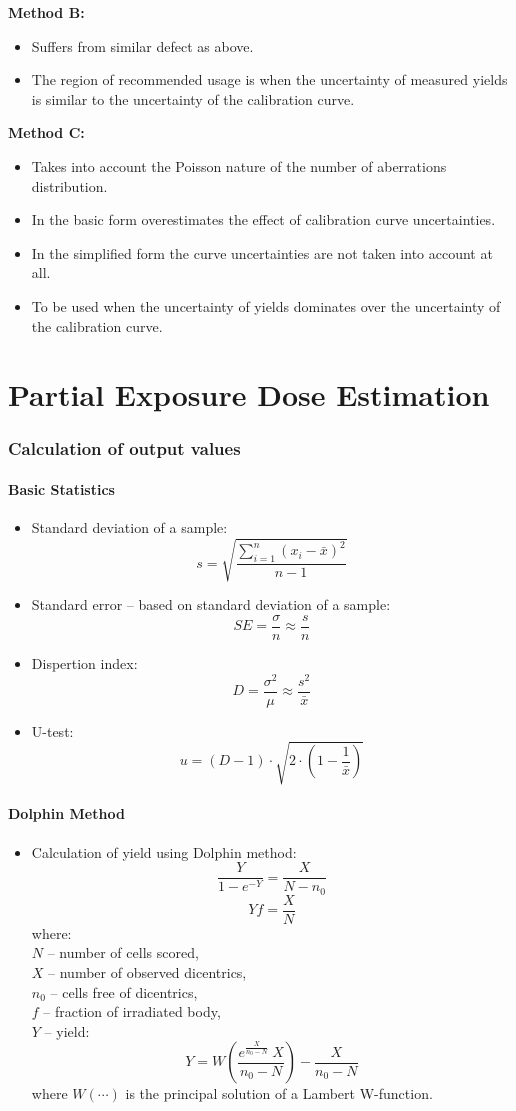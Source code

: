 \documentclass[a4paper,11pt]{article}
\begin{document}
\noindent \textbf{Method B:}
\begin{itemize}
\item Suffers from similar defect as above.
\item The region of recommended usage is when the uncertainty of measured yields is similar to the uncertainty of the calibration curve.
\end{itemize}

\noindent \textbf{Method C:}
\begin{itemize}
\item Takes into account the Poisson nature of the number of aberrations distribution.
\item In the basic form overestimates the effect of calibration curve uncertainties.
\item In the simplified form the curve uncertainties are not taken into account at all.
\item To be used when the uncertainty of yields dominates over the uncertainty of the calibration curve.
\end{itemize}


\part{Partial Exposure Dose Estimation}
\section{Calculation of output values}
\subsection{Basic Statistics}
\begin{itemize}
	\item Standard deviation of a sample:
	$$s = \sqrt{\frac{\sum_{i=1}^n{\left(x_i-\bar{x}\right)^2}}{n-1}}$$
	\item Standard error -- based on standard deviation of a sample:
	$$SE = \frac{\sigma}{n} \approx \frac{s}{n} $$
	\item Dispertion index:
	$$D = \frac{\sigma^2}{\mu} \approx \frac{s^2}{\bar{x}}$$
	\item U-test:
	$$u = \left(D-1\right)\cdot \sqrt{2\cdot\left(1-\frac{1}{\bar{x}}\right)} $$
\end{itemize}
\subsection{Dolphin Method}
\begin{itemize}
	\item Calculation of yield using Dolphin method:
	$$\frac{Y}{1-e^{-Y}} = \frac{X}{N-n_0} $$
	$$Yf = \frac{X}{N}$$
	where:\\
	$N$ -- number of cells scored,\\
	$X$ -- number of observed dicentrics,\\
	$n_0$ -- cells free of dicentrics,\\
	$f$ -- fraction of irradiated body,\\
	$Y$ -- yield:
	$$
	Y = W\left(\frac{e^{\frac{X}{n_0-N}}~X}{n_0-N}\right) - \frac{X}{n_0-N}
	$$
	where $W(\cdots)$ is the principal solution of a Lambert W-function.
\end{itemize}
\end{document}
